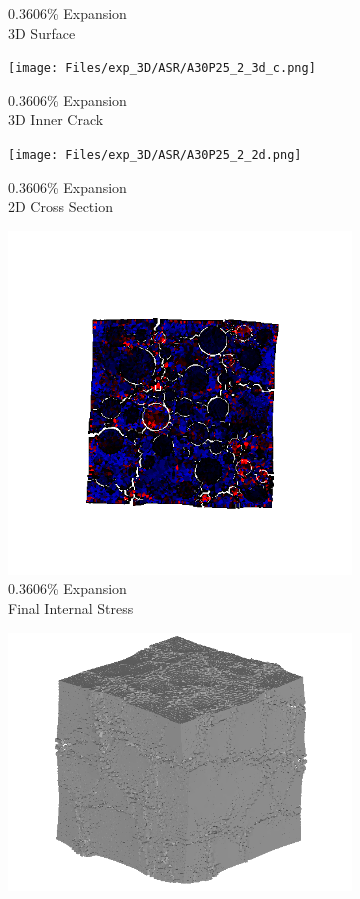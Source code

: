 \begin{figure}[ht!]
\begin{subfigure}{.25\textwidth}
      \caption{0.3606\% Expansion\\3D Surface}
    \end{subfigure}%
    \begin{subfigure}{.25\textwidth}
      \centering
      \texttt{[image: Files/exp\_3D/ASR/A30P25\_2\_3d\_c.png]}
      \caption{0.3606\% Expansion\\3D Inner Crack}
    \end{subfigure}%
    \begin{subfigure}{.25\textwidth}
      \centering
      \texttt{[image: Files/exp\_3D/ASR/A30P25\_2\_2d.png]}
      \caption{0.3606\% Expansion\\2D Cross Section}
    \end{subfigure}%
    \begin{subfigure}{.25\textwidth}
      \centering
      \includegraphics[width=.8\linewidth]{Files/exp_3D/ASR/A30P25_2_stress.png}
      \caption{0.3606\% Expansion\\Final Internal Stress}
    \end{subfigure}
    \begin{subfigure}{.25\textwidth}
      \centering
      \includegraphics[width=.8\linewidth]{Files/exp_3D/ASR/A30P25_3_3d.png}

\end{subfigure}
\end{figure}
